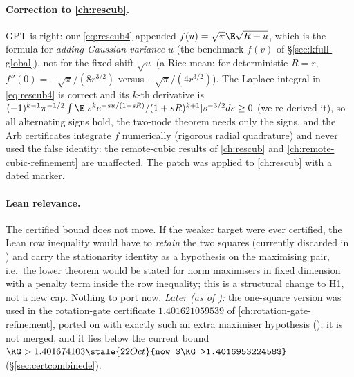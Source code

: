 \paragraph{Correction to \autoref{ch:rescub}.} GPT is right: our \eqref{eq:rescub4} appended $f(u)=\sqrt\pi\E\sqrt{R+u}$, which is the formula for \emph{adding Gaussian variance} $u$ (the
benchmark $f(v)$ of \S\ref{sec:kfull-global}), not for the fixed shift $\sqrt u$ (a Rice mean: for deterministic $R=r$, $f''(0)=-\sqrt\pi/(8r^{3/2})$ versus $-\sqrt\pi/(4r^{3/2})$). The Laplace integral in
\eqref{eq:rescub4} is correct and its $k$-th derivative is $(-1)^{k-1}\pi^{-1/2}\int\E[s^ke^{-su/(1+sR)}/(1+sR)^{k+1}]s^{-3/2}ds\ge0$ (we re-derived it), so all alternating signs hold, the two-node
theorem needs only the signs, and the Arb certificates integrate $f$ numerically (rigorous radial quadrature) and never used the false identity: the remote-cubic results of \autoref{ch:rescub}
and \autoref{ch:remote-cubic-refinement} are unaffected. The patch was applied to \autoref{ch:rescub} with a dated marker.
\paragraph{Lean relevance.} The certified bound does not move. If the weaker target were ever certified, the Lean row inequality would have to \emph{retain} the two squares (currently discarded
in ) and carry the stationarity identity as a hypothesis on the maximising pair, i.e.\ the lower theorem would be stated for norm maximisers in fixed dimension with a penalty term
inside the row inequality; this is a structural change to H1, not a new cap. Nothing to port now. \emph{Later (as of ):} the one-square version was used in the rotation-gate
certificate $1.401621059539$ of \autoref{ch:rotation-gate-refinement}, ported on  with exactly such an extra maximiser hypothesis (); it is not merged,
and it lies below the current bound $\KG>1.401674103\stale{22 Oct}{now $\KG>1.401695322458$}$ (\S\ref{sec:certcombinede}).

